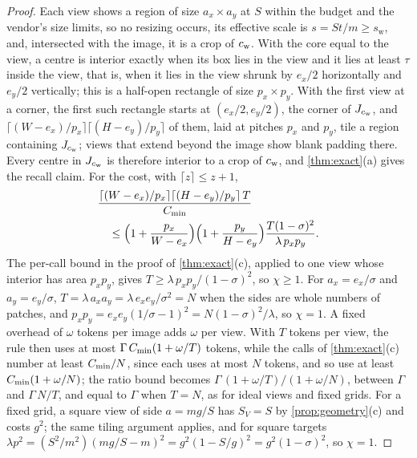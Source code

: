\begin{proof}
Each view shows a region of size $a_x \times a_y$ at $S$ within the budget and the vendor's size limits, so no resizing occurs, its effective scale is $s = St/m \ge s_{\mathrm{w}}$, and, intersected with the image, it is a crop of $c_{\mathrm{w}}$. With the core equal to the view, a centre is interior exactly when its box lies in the view and it lies at least $\tau$ inside the view, that is, when it lies in the view shrunk by $e_x/2$ horizontally and $e_y/2$ vertically; this is a half-open rectangle of size $p_x \times p_y$. With the first view at a corner, the first such rectangle starts at $(e_x/2, e_y/2)$, the corner of $J_{c_{\mathrm{w}}}$, and $\lceil (W-e_x)/p_x\rceil\lceil (H-e_y)/p_y\rceil$ of them, laid at pitches $p_x$ and $p_y$, tile a region containing $J_{c_{\mathrm{w}}}$; views that extend beyond the image show blank padding there. Every centre in $J_{c_{\mathrm{w}}}$ is therefore interior to a crop of $c_{\mathrm{w}}$, and \cref{thm:exact}(a) gives the recall claim. For the cost, with $\lceil z \rceil \le z + 1$,
\begin{align*}
&\frac{\lceil (W-e_x)/p_x\rceil\lceil (H-e_y)/p_y\rceil\,T}{C_{\min}}\\
&\quad\le \Big(1+\frac{p_x}{W-e_x}\Big)\Big(1+\frac{p_y}{H-e_y}\Big)\frac{T(1-\sigma)^2}{\lambda\,p_xp_y}.
\end{align*}
The per-call bound in the proof of \cref{thm:exact}(c), applied to one view whose interior has area $p_xp_y$, gives $T \ge \lambda\,p_xp_y/(1-\sigma)^2$, so $\chi \ge 1$. For $a_x = e_x/\sigma$ and $a_y = e_y/\sigma$, $T = \lambda\,a_xa_y = \lambda\,e_xe_y/\sigma^2 = N$ when the sides are whole numbers of patches, and $p_xp_y = e_xe_y(1/\sigma - 1)^2 = N(1-\sigma)^2/\lambda$, so $\chi = 1$. A fixed overhead of $\omega$ tokens per image adds $\omega$ per view. With $T$ tokens per view, the rule then uses at most $\Gamma\,C_{\min}(1 + \omega/T)$ tokens, while the calls of \cref{thm:exact}(c) number at least $C_{\min}/N$, since each uses at most $N$ tokens, and so use at least $C_{\min}(1 + \omega/N)$; the ratio bound becomes $\Gamma\,(1 + \omega/T)/(1 + \omega/N)$, between $\Gamma$ and $\Gamma\,N/T$, and equal to $\Gamma$ when $T = N$, as for ideal views and fixed grids. For a fixed grid, a square view of side $a = mg/S$ has $S_V = S$ by \cref{prop:geometry}(c) and costs $g^2$; the same tiling argument applies, and for square targets $\lambda p^2 = (S^2/m^2)(mg/S - m)^2 = g^2(1 - S/g)^2 = g^2(1-\sigma)^2$, so $\chi = 1$.
\end{proof}

